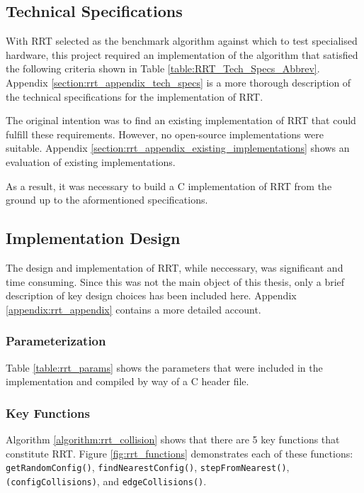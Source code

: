 

\subsection{Technical Specifications}

    With \gls{RRT} selected as the benchmark algorithm against which to test specialised hardware, this project required an implementation of the algorithm that satisfied the following criteria shown in Table \ref{table:RRT_Tech_Specs_Abbrev}. Appendix \ref{section:rrt_appendix_tech_specs} is a more thorough description of the technical specifications for the implementation of RRT. 

    

    The original intention was to find an existing implementation of RRT that could fulfill these requirements. However, no open-source implementations were suitable. Appendix \ref{section:rrt_appendix_existing_implementations} shows an evaluation of existing implementations.

    As a result, it was necessary to build a C implementation of RRT from the ground up to the aformentioned specifications.

\subsection{Implementation Design}
    
    The design and implementation of \gls{RRT}, while neccessary, was significant and time consuming. Since this was not the main object of this thesis, only a brief description of key design choices has been included here. Appendix \ref{appendix:rrt_appendix} contains a more detailed account.

    \subsubsection{Parameterization}
        Table \ref{table:rrt_params} shows the parameters that were included in the implementation and compiled by way of a C header file.
        

    \subsubsection{Key Functions}
        Algorithm \ref{algorithm:rrt_collision} shows that there are 5 key functions that constitute \gls{RRT}. Figure \ref{fig:rrt_functions} demonstrates each of these functions: \texttt{getRandomConfig()}, \texttt{findNearestConfig()}, \texttt{stepFromNearest()}, \texttt{(configCollisions)}, and \texttt{edgeCollisions()}.
        

